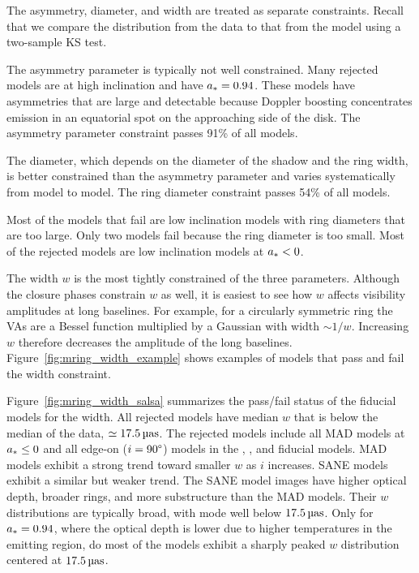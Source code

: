 The \mring asymmetry, diameter, and width are treated as separate constraints.
Recall that we compare the distribution from the data to that from the model using a two-sample KS test.

The asymmetry parameter is typically not well constrained.
Many rejected models are at high inclination and have $a_* =0.94$.
These models have asymmetries that are large and detectable because Doppler boosting concentrates emission in an equatorial spot on the approaching side of the disk.
The asymmetry parameter constraint passes 91\% of all models.

The \mring diameter, which depends on the diameter of the shadow and the ring width, is better constrained than the asymmetry parameter and varies systematically from model to model.
The ring diameter constraint passes 54\% of all models.

Most of the models that fail are low inclination models with ring diameters that are too large. Only two \bhac models fail because the ring diameter is too small.  Most of the rejected models are low inclination models at $a_* < 0$.

The \mring width $w$ is the most tightly constrained of the three \mring parameters.
Although the closure phases constrain $w$ as well, it is easiest to see how $w$ affects visibility amplitudes at long baselines.
For example, for a circularly symmetric ring the VAs are a Bessel function multiplied by a Gaussian with width $\sim 1/w$.  Increasing $w$ therefore decreases the amplitude of the long baselines.
Figure~\ref{fig:mring_width_example} shows examples of models that pass and fail the \mring width constraint.

Figure~\ref{fig:mring_width_salsa} summarizes the pass/fail status of the fiducial models for the \mring width.
All rejected models have median $w$ that is below the median of the data, $ \simeq 17.5\uas$.
The rejected models include all MAD models at $a_* \le 0$ and all edge-on ($i = 90\degree$) models in the \kharma, \bhac, and \hamr fiducial models.
MAD models exhibit a strong trend toward smaller $w$ as $i$ increases.
SANE models exhibit a similar but weaker trend.
The SANE model images have  higher optical depth, broader rings, and more substructure than the MAD models.
Their $w$ distributions are typically broad, with mode well below $17.5\uas$.
Only for $a_* = 0.94$, where the optical depth is lower due to higher temperatures in the emitting region, do most of the models exhibit a sharply peaked $w$ distribution centered at $17.5\uas$.

